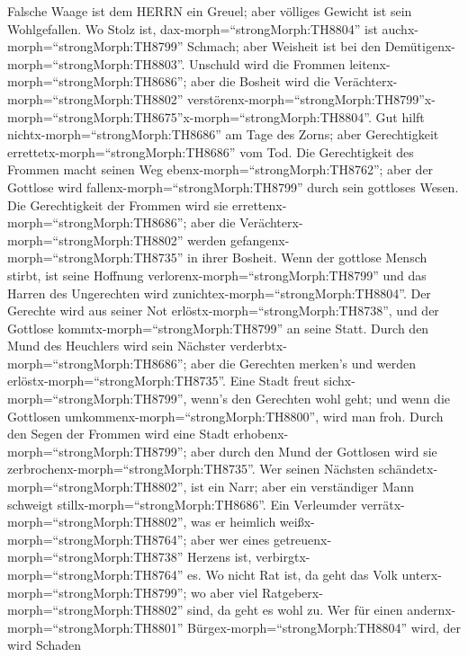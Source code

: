  Falsche Waage ist dem HERRN ein Greuel; aber völliges
Gewicht ist sein Wohlgefallen.  Wo Stolz ist,
dax-morph=``strongMorph:TH8804'' ist auchx-morph=``strongMorph:TH8799''
Schmach; aber Weisheit ist bei den
Demütigenx-morph=``strongMorph:TH8803''.  Unschuld wird die
Frommen leitenx-morph=``strongMorph:TH8686''; aber die Bosheit wird die
Verächterx-morph=``strongMorph:TH8802''
verstörenx-morph=``strongMorph:TH8799''\textbar x-morph=``strongMorph:TH8675''x-morph=``strongMorph:TH8804''.
 Gut hilft nichtx-morph=``strongMorph:TH8686'' am Tage des
Zorns; aber Gerechtigkeit errettetx-morph=``strongMorph:TH8686'' vom
Tod.  Die Gerechtigkeit des Frommen macht seinen Weg
ebenx-morph=``strongMorph:TH8762''; aber der Gottlose wird
fallenx-morph=``strongMorph:TH8799'' durch sein gottloses Wesen.
 Die Gerechtigkeit der Frommen wird sie
errettenx-morph=``strongMorph:TH8686''; aber die
Verächterx-morph=``strongMorph:TH8802'' werden
gefangenx-morph=``strongMorph:TH8735'' in ihrer Bosheit. 
Wenn der gottlose Mensch stirbt, ist seine Hoffnung
verlorenx-morph=``strongMorph:TH8799'' und das Harren des Ungerechten
wird zunichtex-morph=``strongMorph:TH8804''.  Der Gerechte
wird aus seiner Not erlöstx-morph=``strongMorph:TH8738'', und der
Gottlose kommtx-morph=``strongMorph:TH8799'' an seine Statt.
 Durch den Mund des Heuchlers wird sein Nächster
verderbtx-morph=``strongMorph:TH8686''; aber die Gerechten merken's und
werden erlöstx-morph=``strongMorph:TH8735''.  Eine Stadt
freut sichx-morph=``strongMorph:TH8799'', wenn's den Gerechten wohl
geht; und wenn die Gottlosen umkommenx-morph=``strongMorph:TH8800'',
wird man froh.  Durch den Segen der Frommen wird eine Stadt
erhobenx-morph=``strongMorph:TH8799''; aber durch den Mund der Gottlosen
wird sie zerbrochenx-morph=``strongMorph:TH8735''.  Wer
seinen Nächsten schändetx-morph=``strongMorph:TH8802'', ist ein Narr;
aber ein verständiger Mann schweigt stillx-morph=``strongMorph:TH8686''.
 Ein Verleumder verrätx-morph=``strongMorph:TH8802'', was
er heimlich weißx-morph=``strongMorph:TH8764''; aber wer eines
getreuenx-morph=``strongMorph:TH8738'' Herzens ist,
verbirgtx-morph=``strongMorph:TH8764'' es.  Wo nicht Rat
ist, da geht das Volk unterx-morph=``strongMorph:TH8799''; wo aber viel
Ratgeberx-morph=``strongMorph:TH8802'' sind, da geht es wohl zu.
 Wer für einen andernx-morph=``strongMorph:TH8801''
Bürgex-morph=``strongMorph:TH8804'' wird, der wird Schaden
